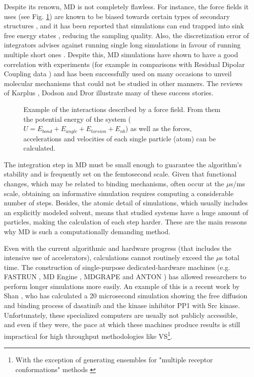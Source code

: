 Despite its renown, MD is not completely flawless. For instance, the force fields it uses (see Fig. \ref{fig:md_force_field}) are known to be biased towards certain types of secondary structures \cite{yildirim_benchmarking_2011, cino_comparison_2012}, and it has been reported that simulations can end trapped into sink free energy states \cite{lange_scrutinizing_2010, raval_refinement_2012}, reducing the sampling quality. Also, the discretization error of integrators advises against running single long simulations in favour of running multiple short ones \cite{lange_scrutinizing_2010, raval_refinement_2012}. Despite this, MD simulations have shown to have a good correlation with experiments (for example in comparisons with Residual Dipolar Coupling data \cite{lin_evaluating_2011}) and has been successfully used on many occasions to unveil molecular mechanisms that could not be studied in other manners. The reviews of Karplus \cite{karplus_molecular_2002}, Dodson \cite{dodson_molecular_2008} and Dror \cite{dror_biomolecular_2012} illustrate many of these success stories. 


\begin{figure}
\caption{Example of the interactions described by a force field. From them the potential energy of the system ($U = E_{bond} + E_{angle} + E_{torsion} + E_{nb} $) as well as the forces, accelerations and velocities of each single particle (atom) can be calculated.}
\label{fig:md_force_field}
\end{figure}

The integration step in MD must be small enough to guarantee the algorithm's stability and is frequently set on the femtosecond scale. Given that functional changes, which may be related to binding mechanisms, often occur at the $\mu$s/ms scale, obtaining an informative simulation requires computing a considerable number of steps. Besides, the atomic detail of simulations, which usually includes an explicitly modeled solvent, means that studied systems have a huge amount of particles, making the calculation of each step harder. These are the main reasons why MD is such a computationally demanding method. 

Even with the current algorithmic and hardware progress (that includes the intensive use of accelerators), calculations cannot routinely exceed the $\mu$s total time. The construction of single-purpose dedicated-hardware machines (e.g. FASTRUN \cite{fine_fastrun_1991}, MD Engine \cite{shinjiro_toyoda_development_1999}, MDGRAPE \cite{taiji_protein_2003} and ANTON \cite{shaw_anton_2008}) has allowed researchers to perform longer simulations more easily. An example of this is a recent work by Shan \cite{shan_how_2011},  who has calculated a 20 microsecond simulation showing the free diffusion and binding process of dasatinib and the kinase inhibitor PP1 with Src kinase. Unfortunately, these specialized computers are usually not publicly accessible, and even if they were, the pace at which these machines produce results is still impractical for high throughput methodologies like VS\footnote{With the exception of generating ensembles for "multiple receptor conformations" methods \cite{gorfe_functional_2005, wong_molecular_2005}}. 

